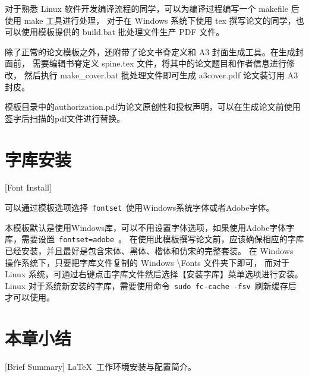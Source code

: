 对于熟悉 Linux 软件开发编译流程的同学，可以为编译过程编写一个 makefile 后使用 make 工具进行处理，
对于在 Windows 系统下使用 tex 撰写论文的同学，也可以使用模板提供的 build.bat 批处理文件生产 PDF 文件。

除了正常的论文模板之外，还附带了论文书脊定义和 A3 封面生成工具。在生成封面前，
需要编辑书脊定义 spine.tex 文件，将其中的论文题目和作者信息进行修改，
然后执行 make\_cover.bat 批处理文件即可生成 a3cover.pdf 论文装订用 A3 封皮。

模板目录中的authorization.pdf为论文原创性和授权声明，可以在生成论文前使用签字后扫描的pdf文件进行替换。

\section{字库安装}[Font Install]

可以通过模板选项选择~\texttt{fontset}~使用Windows系统字体或者Adobe字体。

本模板默认是使用Windows库，可以不用设置字体选项，如果使用Adobe字体字库，需要设置~\texttt{fontset=adobe}~。
在使用此模板撰写论文前，应该确保相应的字库已经安装，并且最好是包含宋体、黑体、楷体和仿宋的完整套装。
在 Windows 操作系统下，只要把字库文件复制的 Windows \textbackslash Fonts 文件夹下即可，
而对于 Linux 系统，可通过右键点击字库文件然后选择【安装字库】菜单选项进行安装。
Linux 对于系统新安装的字库，需要使用命令~\texttt{sudo fc-cache -fsv}~刷新缓存后才可以使用。

\section*{本章小结}[Brief Summary]
\LaTeX{}~工作环境安装与配置简介。
